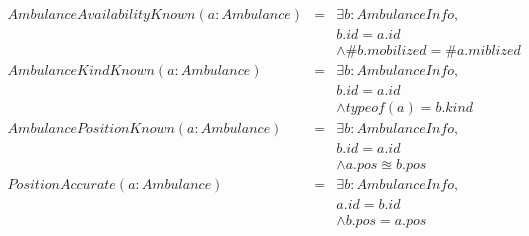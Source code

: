 	\begin{equation*}
		\begin{array}{rcl}
		AmbulanceAvailabilityKnown(a: Ambulance)
		& = & \exists b: AmbulanceInfo, \\
		&   & b.id = a.id \\
		&   & \wedge \#b.mobilized = \#a.miblized \\

		AmbulanceKindKnown(a: Ambulance)
		& = & \exists b: AmbulanceInfo, \\
		&   & b.id = a.id \\
		&   & \wedge typeof(a) = b.kind \\

		AmbulancePositionKnown(a:Ambulance)
		& = & \exists b:AmbulanceInfo, \\
		&   & b.id = a.id \\
		&   & \wedge a.pos \approxeq b.pos \\
		
		PositionAccurate(a:Ambulance)
		& = & \exists b:AmbulanceInfo, \\
		&   & a.id = b.id \\
		&   & \wedge b.pos = a.pos \\
		\end{array}
	\end{equation*}



